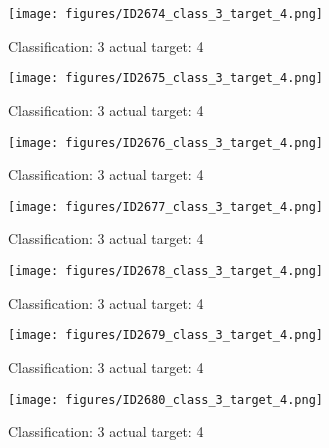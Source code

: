 \begin{figure}[h!]
\begin{center}
\texttt{[image: figures/ID2674\_class\_3\_target\_4.png]}
\end{center}
\caption{ Classification: 3 actual target: 4}
\label{fig:ID2674_class_3_target_4}
\end{figure}
\begin{figure}[h!]
\begin{center}
\texttt{[image: figures/ID2675\_class\_3\_target\_4.png]}
\end{center}
\caption{ Classification: 3 actual target: 4}
\label{fig:ID2675_class_3_target_4}
\end{figure}
\begin{figure}[h!]
\begin{center}
\texttt{[image: figures/ID2676\_class\_3\_target\_4.png]}
\end{center}
\caption{ Classification: 3 actual target: 4}
\label{fig:ID2676_class_3_target_4}
\end{figure}
\begin{figure}[h!]
\begin{center}
\texttt{[image: figures/ID2677\_class\_3\_target\_4.png]}
\end{center}
\caption{ Classification: 3 actual target: 4}
\label{fig:ID2677_class_3_target_4}
\end{figure}
\begin{figure}[h!]
\begin{center}
\texttt{[image: figures/ID2678\_class\_3\_target\_4.png]}
\end{center}
\caption{ Classification: 3 actual target: 4}
\label{fig:ID2678_class_3_target_4}
\end{figure}
\begin{figure}[h!]
\begin{center}
\texttt{[image: figures/ID2679\_class\_3\_target\_4.png]}
\end{center}
\caption{ Classification: 3 actual target: 4}
\label{fig:ID2679_class_3_target_4}
\end{figure}
\begin{figure}[h!]
\begin{center}
\texttt{[image: figures/ID2680\_class\_3\_target\_4.png]}
\end{center}
\caption{ Classification: 3 actual target: 4}
\label{fig:ID2680_class_3_target_4}
\end{figure}
